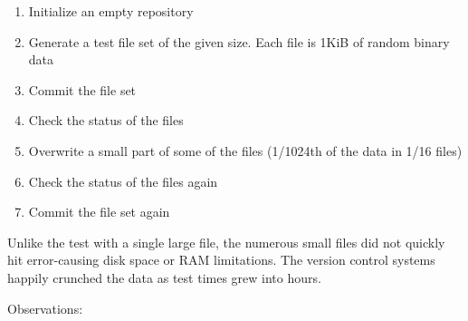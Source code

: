 \documentclass[12pt,a4paper,two-side]{book}
\begin{document}
\begin{enumerate}
    \setlength{\itemsep}{0pt}
    \setlength{\parskip}{0pt}
    \setlength{\parsep}{0pt}
    \item Initialize an empty repository
    \item Generate a test file set of the given size. Each file is 1KiB of
        random binary data
    \item Commit the file set
    \item Check the status of the files
    \item Overwrite a small part of some of the files (1/1024th of the data in
        1/16 files)
    \item Check the status of the files again
    \item Commit the file set again
\end{enumerate}

Unlike the test with a single large file, the numerous small files did not
quickly hit error-causing disk space or RAM limitations. The version control
systems happily crunched the data as test times grew into hours.

Observations:
\end{document}
